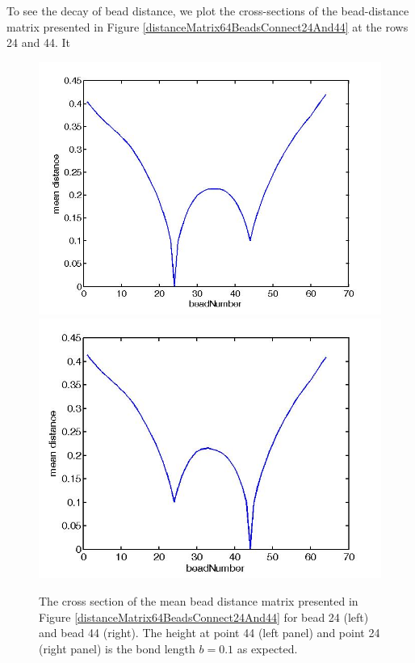 \documentclass[12pt]{paper}
\begin{document}
To see the decay of bead distance, we plot the cross-sections of the bead-distance matrix presented in Figure \ref{distanceMatrix64BeadsConnect24And44} at the rows 24 and 44. It 
\begin{figure}[H]
\includegraphics[scale=0.3]{crossectionAtRow24DistanceMatrix64BeadsConnect24And44}
\includegraphics[scale=0.32]{crossectionAtRow44DistanceMatrix64BeadsConnect24And44}
\caption{\scriptsize{The cross section of the mean bead distance matrix presented in Figure \ref{distanceMatrix64BeadsConnect24And44} for bead 24 (left) and bead 44 (right). The height at point 44 (left panel) and point 24 (right panel) is the bond length $b=0.1$ as expected.}}
\label{crossectionAtRow24DistanceMatrix64BeadsConnect24And44}
\end{figure}
\end{document}

